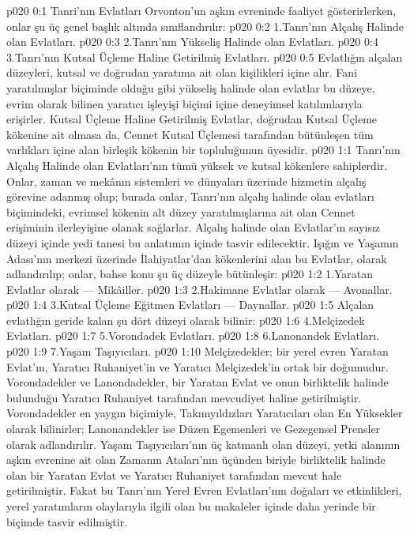 \vs p020 0:1 Tanri’nın Evlatları Orvonton’un aşkın evreninde faaliyet gösterirlerken, onlar şu üç genel başlık altında sınıflandırılır:
\vs p020 0:2 1.\bibnobreakspace Tanrı’nın Alçalış Halinde olan Evlatları.
\vs p020 0:3 2.\bibnobreakspace Tanrı’nın Yükseliş Halinde olan Evlatları.
\vs p020 0:4 3.\bibnobreakspace Tanrı’nın Kutsal Üçleme Haline Getirilmiş Evlatları.
\vs p020 0:5 Evlatlığın alçalan düzeyleri, kutsal ve doğrudan yaratıma ait olan kişilikleri içine alır. Fani yaratılmışlar biçiminde olduğu gibi yükseliş halinde olan evlatlar bu düzeye, evrim olarak bilinen yaratıcı işleyişi biçimi içine deneyimsel katılımlarıyla erişirler. Kutsal Üçleme Haline Getirilmiş Evlatlar, doğrudan Kutsal Üçleme kökenine ait olmasa da, Cennet Kutsal Üçlemesi tarafından bütünleşen tüm varlıkları içine alan birleşik kökenin bir topluluğunun üyesidir.
\vs p020 1:1 Tanrı’nın Alçalış Halinde olan Evlatları’nın tümü yüksek ve kutsal kökenlere sahiplerdir. Onlar, zaman ve mekânın sistemleri ve dünyaları üzerinde hizmetin alçalış görevine adanmış olup; burada onlar, Tanrı’nın alçalış halinde olan evlatları biçimindeki, evrimsel kökenin alt düzey yaratılmışlarına ait olan Cennet erişiminin ilerleyişine olanak sağlarlar. Alçalış halinde olan Evlatlar’ın sayısız düzeyi içinde yedi tanesi bu anlatımın içinde tasvir edilecektir. Işığın ve Yaşamın Adası’nın merkezi üzerinde İlahiyatlar’dan kökenlerini alan bu Evlatlar,  olarak adlandırılıp; onlar, bahse konu şu üç düzeyle bütünleşir:
\vs p020 1:2 1.\bibnobreakspace Yaratan Evlatlar olarak --- Mikâiller.
\vs p020 1:3 2.\bibnobreakspace Hakimane Evlatlar olarak --- Avonallar.
\vs p020 1:4 3.\bibnobreakspace Kutsal Üçleme Eğitmen Evlatları --- Daynallar.
\vs p020 1:5 Alçalan evlatlığın geride kalan şu dört düzeyi  olarak bilinir:
\vs p020 1:6 4.\bibnobreakspace Melçizedek Evlatları.
\vs p020 1:7 5.\bibnobreakspace Vorondadek Evlatları.
\vs p020 1:8 6.\bibnobreakspace Lanonandek Evlatları.
\vs p020 1:9 7.\bibnobreakspace Yaşam Taşıyıcıları.
\vs p020 1:10 Melçizedekler; bir yerel evren Yaratan Evlat’ın, Yaratıcı Ruhaniyet’in ve Yaratıcı Melçizedek’in ortak bir doğumudur. Vorondadekler ve Lanondadekler, bir Yaratan Evlat ve onun birliktelik halinde bulunduğu Yaratıcı Ruhaniyet tarafından mevcudiyet haline getirilmiştir. Vorondadekler en yaygın biçimiyle, Takımyıldızları Yaratıcıları olan En Yüksekler olarak bilinirler; Lanonandekler ise Düzen Egemenleri ve Gezegensel Prensler olarak adlandırılır. Yaşam Taşıyıcıları’nın üç katmanlı olan düzeyi, yetki alanının aşkın evrenine ait olan Zamanın Ataları’nın üçünden biriyle birliktelik halinde olan bir Yaratan Evlat ve Yaratıcı Ruhaniyet tarafından mevcut hale getirilmiştir. Fakat bu Tanrı’nın Yerel Evren Evlatları’nın doğaları ve etkinlikleri, yerel yaratımların olaylarıyla ilgili olan bu makaleler içinde daha yerinde bir biçimde tasvir edilmiştir.
